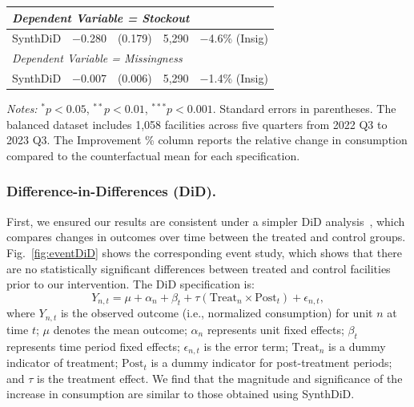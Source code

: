 \documentclass[12pt]{article}
\begin{document}
\begin{table}[t]
\begin{threeparttable}
\begin{tabular}{l c c c c}
\midrule
\multicolumn{5}{l}{\textit{Dependent Variable = Stockout}} \\
\midrule
SynthDiD & $-$0.280 & (0.179) & 5,290 & $-$4.6\% (Insig) \\
\midrule
\multicolumn{5}{l}{\textit{Dependent Variable = Missingness}} \\
\midrule
SynthDiD & $-$0.007 & (0.006) & 5,290 & $-$1.4\% (Insig) \\
\bottomrule
\end{tabular}
\begin{tablenotes}[flushleft]
\footnotesize
\item \textit{Notes:} $^{*} p < 0.05$, $^{**} p < 0.01$, $^{***} p < 0.001$. Standard errors in parentheses.
The balanced dataset includes 1,058 facilities across five quarters from 2022 Q3 to 2023 Q3. The Improvement \% column reports the relative change in consumption compared to the counterfactual mean for each specification.
\end{tablenotes}
\end{threeparttable}
\label{tab:allr3}
\end{table}

\subsubsection{Difference-in-Differences (DiD).}

First, we ensured our results are consistent under a simpler DiD analysis~\cite{ashenfelter1984using}, which compares changes in outcomes over time between the treated and control groups. Fig.~\ref{fig:eventDiD} shows the corresponding event study, which shows that there are no statistically significant differences between treated and control facilities prior to our intervention. The DiD specification is:
\begin{equation}
Y_{n,t} = \mu + \alpha_n + \beta_t + \tau (\text{Treat}_n \times \text{Post}_t)

+ \epsilon_{n,t},
\end{equation}
where $Y_{n,t}$ is the observed outcome (i.e., normalized consumption) for unit $n$ at time $t$; $\mu$ denotes the mean outcome; $\alpha_n$ represents unit fixed effects; $\beta_t$ represents time period fixed effects;
$\epsilon_{n,t}$ is the error term; $\text{Treat}_n$ is a dummy indicator of treatment; $\text{Post}_t$ is a dummy indicator for post-treatment periods; and $\tau$ is the treatment effect. We find that the magnitude and significance of the increase in consumption are similar to those obtained using SynthDiD.
\end{document}
